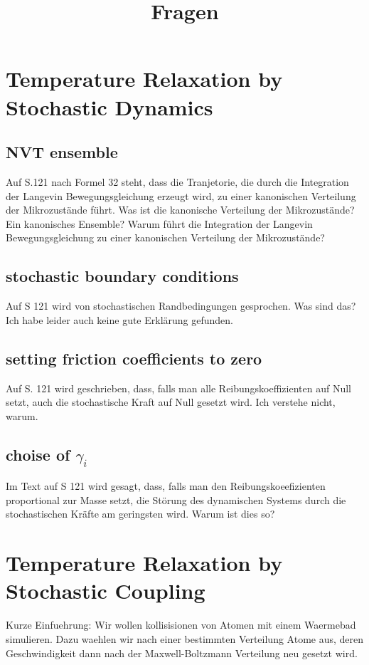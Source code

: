 \documentclass[]{article}
\title{Fragen}
\begin{document}
\maketitle

\section{Temperature Relaxation by Stochastic Dynamics}

\subsection{NVT ensemble}
Auf S.121 nach Formel 32 steht, dass die Tranjetorie, die durch die Integration der Langevin Bewegungsgleichung erzeugt wird, zu einer kanonischen Verteilung der Mikrozustände führt. Was ist die kanonische Verteilung der Mikrozustände? Ein kanonisches Ensemble? Warum führt die Integration der Langevin Bewegungsgleichung zu einer kanonischen Verteilung der Mikrozustände?

\subsection{stochastic boundary conditions}
Auf S 121 wird von stochastischen Randbedingungen gesprochen. Was sind das? Ich habe leider auch keine gute Erklärung gefunden.

\subsection{setting friction coefficients to zero}
Auf S. 121 wird geschrieben, dass, falls man alle Reibungskoeffizienten auf Null setzt, auch die stochastische Kraft auf Null gesetzt wird. Ich verstehe nicht, warum. 

\subsection{choise of $\gamma_i$}
Im Text auf S 121 wird gesagt, dass, falls man den Reibungskoeefizienten proportional zur Masse setzt, die Störung des dynamischen Systems durch die stochastischen Kräfte am geringsten wird. Warum ist dies so?  

\section{Temperature Relaxation by Stochastic Coupling}

Kurze Einfuehrung: Wir wollen kollisisionen von Atomen mit einem Waermebad simulieren.
Dazu waehlen wir nach einer bestimmten Verteilung Atome aus, deren Geschwindigkeit dann nach der Maxwell-Boltzmann Verteilung neu gesetzt wird. 
\end{document}
